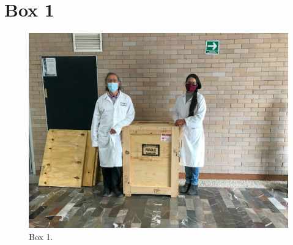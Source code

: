 \documentclass{article}
\begin{document}

\clearpage
\section{Box 1}

\begin{figure}[bp]
\begin{center}
\includegraphics[width=0.60\linewidth]{figures/20201210T144505.jpg}
\end{center}
\caption{Box 1.}
\label{figure:box-one}
\end{figure}
\end{document}
